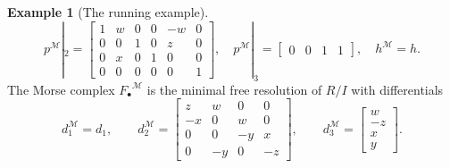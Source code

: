 \documentclass[12pt]{amsart}
\theoremstyle{plain}
\theoremstyle{definition}
\newtheorem{example}[theorem]{Example}
\newcommand{\F}{ {F_\bullet} }
\newcommand{\M}{\mathcal{M}}
\begin{document}
\begin{example}[The running example]
\[    p^{\M}|_2 = \begin{bmatrix} 1 & w & 0 & 0 & -w & 0\\ 0 & 0 & 1 & 0 & z & 0\\ 0 & x & 0 & 1 & 0 & 0\\ 0 & 0 & 0 & 0 & 0 & 1 \end{bmatrix}, \quad
    p^{\M}|_3 = \begin{bmatrix} 0 & 0 & 1 & 1 \end{bmatrix}, \quad
    h^{\M} = h .
\]
The Morse complex $\F^{\M}$ is the minimal free resolution of $R/I$ with differentials
\[
    d^{\M}_1 = d_1, \qquad
    d^{\M}_2 = \begin{bmatrix} z & w & 0 & 0\\ -x & 0 & w & 0\\ 0 & 0 & -y & x\\ 0 & -y & 0 & -z \end{bmatrix}, \qquad
    d^{\M}_3 = \begin{bmatrix} w\\ -z\\ x\\ y \end{bmatrix}.
\]
\end{example}
\end{document}
